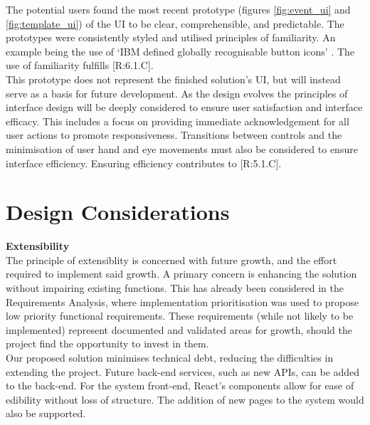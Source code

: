 \documentclass[9pt, titlepage]{extarticle}
\begin{document}
The potential users found the most recent prototype (figures \ref{fig:event_ui} and \ref{fig:template_ui}) of the UI to be clear, comprehensible, and predictable. The prototypes were consistently styled and utilised principles of familiarity. An example being the use of `IBM defined globally recognisable button icons' \autocite{ibm}. The use of familiarity fulfills [R:6.1.C].\\

This prototype does not represent the finished solution's UI, but will instead serve as a basis for future development. As the design evolves the principles of interface design will be deeply considered to ensure user satisfaction and interface efficacy. This includes a focus on providing immediate acknowledgement for all user actions to promote responsiveness. Transitions between controls and the minimisation of user hand and eye movements must also be considered to ensure interface efficiency. Ensuring efficiency contributes to [R:5.1.C].

\section{Design Considerations}

\textbf{Extensibility}\\
The principle of extensiblity is concerned with future growth, and the effort required to implement said growth. A primary concern is enhancing the solution without impairing existing functions. This has already been considered in the Requirements Analysis, where implementation prioritisation was used to propose low priority functional requirements. These requirements (while not likely to be implemented) represent documented and validated areas for growth, should the project find the opportunity to invest in them. \\

Our proposed solution minimises technical debt, reducing the difficulties in extending the project. Future back-end services, such as new APIs, can be added to the back-end. For the system front-end, React's components allow for ease of edibility without loss of structure. The addition of new pages to the system would also be supported.\\
\end{document}
